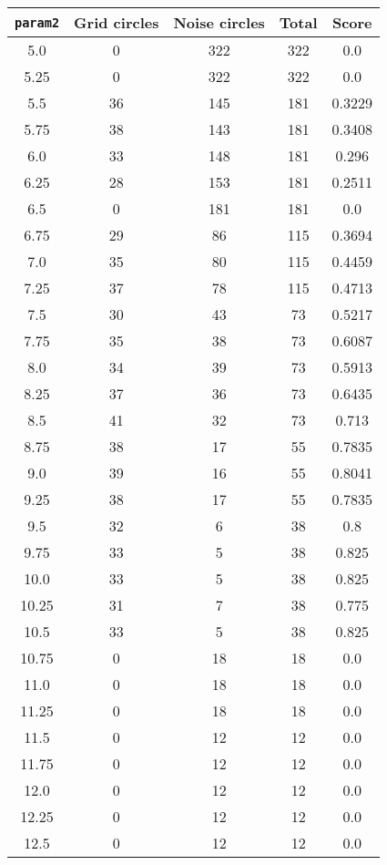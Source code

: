 \documentclass[letterpaper, 12pt]{article}
\begin{document}
\begin{longtable}{|c|c|c|c|c|}
\hline
\textbf{\texttt{param2}} & \textbf{Grid circles} & \textbf{Noise circles} & \textbf{Total} & \textbf{Score} \\
\hline
5.0 & 0 & 322 & 322 & 0.0 \\
\hline
5.25 & 0 & 322 & 322 & 0.0 \\
\hline
5.5 & 36 & 145 & 181 & 0.3229 \\
\hline
5.75 & 38 & 143 & 181 & 0.3408 \\
\hline
6.0 & 33 & 148 & 181 & 0.296 \\
\hline
6.25 & 28 & 153 & 181 & 0.2511 \\
\hline
6.5 & 0 & 181 & 181 & 0.0 \\
\hline
6.75 & 29 & 86 & 115 & 0.3694 \\
\hline
7.0 & 35 & 80 & 115 & 0.4459 \\
\hline
7.25 & 37 & 78 & 115 & 0.4713 \\
\hline
7.5 & 30 & 43 & 73 & 0.5217 \\
\hline
7.75 & 35 & 38 & 73 & 0.6087 \\
\hline
8.0 & 34 & 39 & 73 & 0.5913 \\
\hline
8.25 & 37 & 36 & 73 & 0.6435 \\
\hline
8.5 & 41 & 32 & 73 & 0.713 \\
\hline
8.75 & 38 & 17 & 55 & 0.7835 \\
\hline
9.0 & 39 & 16 & 55 & 0.8041 \\
\hline
9.25 & 38 & 17 & 55 & 0.7835 \\
\hline
9.5 & 32 & 6 & 38 & 0.8 \\
\hline
9.75 & 33 & 5 & 38 & 0.825 \\
\hline
10.0 & 33 & 5 & 38 & 0.825 \\
\hline
10.25 & 31 & 7 & 38 & 0.775 \\
\hline
10.5 & 33 & 5 & 38 & 0.825 \\
\hline
10.75 & 0 & 18 & 18 & 0.0 \\
\hline
11.0 & 0 & 18 & 18 & 0.0 \\
\hline
11.25 & 0 & 18 & 18 & 0.0 \\
\hline
11.5 & 0 & 12 & 12 & 0.0 \\
\hline
11.75 & 0 & 12 & 12 & 0.0 \\
\hline
12.0 & 0 & 12 & 12 & 0.0 \\
\hline
12.25 & 0 & 12 & 12 & 0.0 \\
\hline
12.5 & 0 & 12 & 12 & 0.0 \\

\end{longtable}
\end{document}
